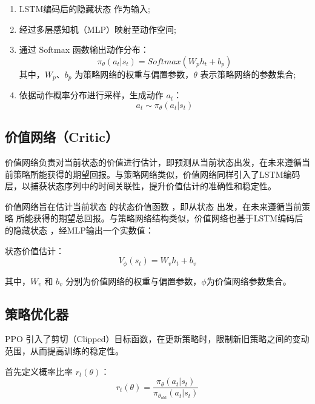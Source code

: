 \begin{enumerate} [label=\arabic*)] 

\item LSTM编码后的隐藏状态  作为输入;

\item 经过多层感知机（MLP）映射至动作空间;

\item 通过 Softmax 函数输出动作分布：
\begin{equation}
\pi_{\theta}(a_t | s_t) = Softmax(W_p h_t + b_p)
\tag{4.8}
\end{equation}
其中，$W_p$、$b_p$ 为策略网络的权重与偏置参数，$\theta$ 表示策略网络的参数集合;

\item 依据动作概率分布进行采样，生成动作 $a_t$：
\begin{equation}
a_t \sim \pi_\theta(a_t | s_t)
\end{equation}

\end{enumerate}

\subsection{价值网络（Critic）}

价值网络负责对当前状态的价值进行估计，即预测从当前状态出发，在未来遵循当前策略所能获得的期望回报。与策略网络类似，价值网络同样引入了LSTM编码层，以捕获状态序列中的时间关联性，提升价值估计的准确性和稳定性。

价值网络旨在估计当前状态  的状态价值函数 ，即从状态  出发，在未来遵循当前策略  所能获得的期望总回报。与策略网络结构类似，价值网络也基于LSTM编码后的隐藏状态 ，经MLP输出一个实数值：

状态价值估计：
\begin{equation}
V_{\phi}(s_t) = W_v h_t + b_v
\end{equation}

其中，$W_v$ 和 $b_v$ 分别为价值网络的权重与偏置参数，${\phi}$为价值网络参数集合。

\subsection{策略优化器}

PPO 引入了剪切（Clipped）目标函数，在更新策略时，限制新旧策略之间的变动范围，从而提高训练的稳定性。

首先定义概率比率 \(r_t(\theta)\)：
\begin{equation}
	r_t(\theta) = \frac{\pi_{\theta}(a_t | s_t)}{\pi_{\theta_{\text{old}}}(a_t | s_t)} \tag{4.11}
\end{equation}

